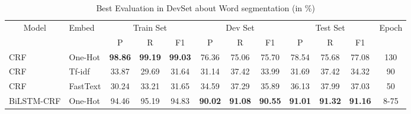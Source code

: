 \begin{table}[htbp!]
    \centering
    \begin{tabular}{llcccccccccc}
    \toprule
        \multicolumn{1}{c}{\multirow{2}{*}{Model}} & \multirow{2}{*}{Embed}      & \multicolumn{3}{c}{Train Set}     & \multicolumn{3}{c}{Dev Set}           & \multicolumn{3}{c}{Test Set}    &\multirow{2}{*}{Epoch}       \\
        \multicolumn{1}{c}{}                       &                             & P             & R        & F1     & P             & R        & F1         & P             & R        & F1   &       \\
        \midrule
        CRF        & One-Hot  & \bf{98.86}   & \bf{99.19}   & \bf{99.03}    & 76.36 & 75.06 & 75.70  & 78.54  & 75.68  & 77.08   & 130        \\
        CRF        & Tf-idf   & 33.87   & 29.69   & 31.64    & 31.14 & 37.42 & 33.99  & 31.69  & 37.42  & 34.32   & 90         \\
        CRF        & FastText & 30.24   & 33.21   & 31.65    & 34.59 & 37.29 & 35.89  & 36.13  & 37.99  & 37.03   & 50         \\
        BiLSTM-CRF & One-Hot  & 94.46   & 95.19   & 94.83    & \bf{90.02} & \bf{91.08} & \bf{90.55}  & \bf{91.01}  & \bf{91.32}  & \bf{91.16}   & 8-75       \\
    \bottomrule
    \end{tabular}
\caption{Best Evaluation in DevSet about Word segmentation (in \%)}
\label{tab:cws_result}
\end{table}